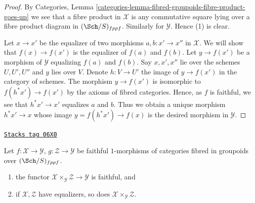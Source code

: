 \begin{proof}
By
Categories, Lemma \ref{categories-lemma-fibred-groupoids-fibre-product-goes-up}
we see that a fibre product in $\mathcal{X}$ is any commutative square lying
over a fibre product diagram in $(\Sch/S)_{fppf}$. Similarly for
$\mathcal{Y}$. Hence (1) is clear.

\medskip\noindent
Let $x \to x'$ be the equalizer of two morphisms $a, b : x' \to x''$
in $\mathcal{X}$. We will show that $f(x) \to f(x')$ is the equalizer
of $f(a)$ and $f(b)$. Let $y \to f(x')$ be a morphism of $\mathcal{Y}$
equalizing $f(a)$ and $f(b)$. Say $x, x', x''$ lie over the schemes
$U, U', U''$ and $y$ lies over $V$. Denote $h : V \to U'$ the image
of $y \to f(x')$ in the category of schemes. The morphism
$y \to f(x')$ is isomorphic to $f(h^*x') \to f(x')$ by the axioms of
fibred categories. Hence, as $f$ is faithful, we see that
$h^*x' \to x'$ equalizes $a$ and $b$. Thus we obtain a unique morphism
$h^*x' \to x$ whose image $y = f(h^*x') \to f(x)$ is the desired morphism
in $\mathcal{Y}$.
\end{proof}

\begin{lemma}
\label{stacks-sheaves-lemma-fibre-products-preserve-properties}
\href{https://stacks.math.columbia.edu/tag/06X0}{\texttt{Stacks tag 06X0}}

Let $f : \mathcal{X} \to \mathcal{Y}$, $g : \mathcal{Z} \to \mathcal{Y}$
be faithful $1$-morphisms of categories
fibred in groupoids over $(\Sch/S)_{fppf}$.
\begin{enumerate}
\item the functor $\mathcal{X} \times_\mathcal{Y} \mathcal{Z} \to \mathcal{Y}$
is faithful, and
\item if $\mathcal{X}, \mathcal{Z}$ have equalizers, so does
$\mathcal{X} \times_\mathcal{Y} \mathcal{Z}$.
\end{enumerate}
\end{lemma}

